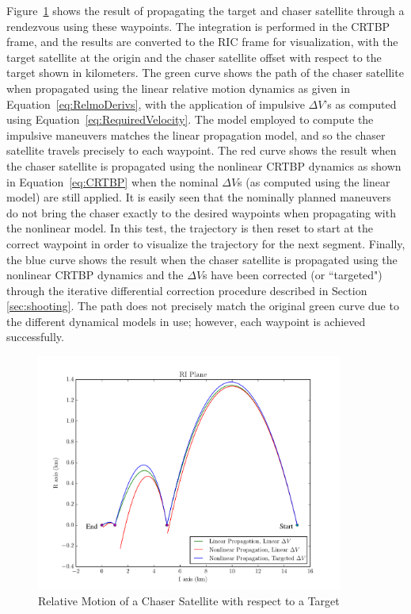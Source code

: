 \documentclass[letterpaper, preprint, paper,11pt]{AAS}	%
\begin{document}
Figure~\ref{fig:RIC_1} shows the result of propagating the target and chaser satellite through a rendezvous using these waypoints.  The integration is performed in the CRTBP frame, and the results are converted to the RIC frame for visualization, with the target satellite at the origin and the chaser satellite offset with respect to the target shown in kilometers.  The green curve shows the path of the chaser satellite when propagated using the linear relative motion dynamics as given in Equation~\eqref{eq:RelmoDerivs}, with the application of impulsive \(\Delta V\)'s as computed using Equation~\eqref{eq:RequiredVelocity}.  The model employed to compute the impulsive maneuvers matches the linear propagation model, and so the chaser satellite travels precisely to each waypoint.  The red curve shows the result when the chaser satellite is propagated using the nonlinear CRTBP dynamics as shown in Equation~\eqref{eq:CRTBP} when the nominal \(\Delta V\)s (as computed using the linear model) are still applied.  It is easily seen that the nominally planned maneuvers do not bring the chaser exactly to the desired waypoints when propagating with the nonlinear model. In this test, the trajectory is then reset to start at the correct waypoint in order to visualize the trajectory for the next segment. Finally, the blue curve shows the result when the chaser satellite is propagated using the nonlinear CRTBP dynamics and the \(\Delta V\)s have been corrected (or ``targeted") through the iterative differential correction procedure described in Section \ref{sec:shooting}.  The path does not precisely match the original green curve due to the different dynamical models in use; however, each waypoint is achieved successfully.  %

\begin{figure}[h] 
	\begin{center}
		\includegraphics[width=0.9\textwidth]{RIC_1}
		\caption{Relative Motion of a Chaser Satellite with respect to a Target}
		\label{fig:RIC_1}
	\end{center}
\end{figure} %
\end{document}

